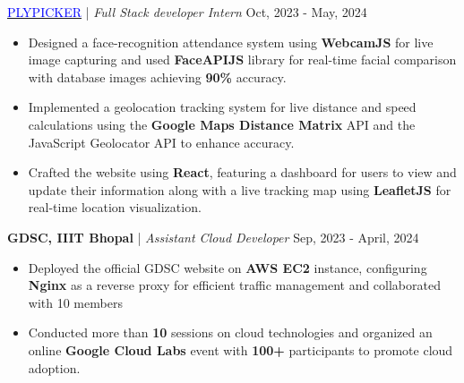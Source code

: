 \documentclass[a4paper]{article}
\begin{document}
 \href{https://drive.google.com/file/d/11zeejmn9jYHZrTlOk4Zbljxd8T7ecB0m/view?usp=sharing}{\textcolor{blue}{PLYPICKER}} {| \sl Full Stack developer Intern} \hfill Oct, 2023 - May, 2024 %
\begin{itemize}
    \vspace{-1mm}
    \item Designed a face-recognition attendance system using \textbf{WebcamJS} for live image capturing and used \textbf{FaceAPIJS} library for real-time facial comparison with database images achieving \textbf{90\%} accuracy.
    \vspace{-1mm}
    \item Implemented a geolocation tracking system for live distance and speed calculations using the \textbf{Google Maps Distance Matrix} API and the JavaScript Geolocator API to enhance accuracy.
    \item Crafted the website using \textbf{React}, featuring a dashboard for users to view and update their information along with a live tracking map using \textbf{LeafletJS} for real-time location visualization.
    \vspace{-1mm}
\end{itemize} 
\vspace{1mm}
\textbf{GDSC, IIIT Bhopal} {| \sl Assistant Cloud Developer} \hfill Sep, 2023 - April, 2024 %
\begin{itemize}
    \vspace{-1mm}
    \item Deployed the official GDSC website on \textbf{AWS EC2} instance, configuring \textbf{Nginx} as a reverse proxy for efficient traffic management and collaborated with 10 members
    \vspace{-1mm}
    \item Conducted more than \textbf{10} sessions on cloud technologies and organized an online \textbf{Google Cloud Labs} event with \textbf{100+} participants to promote cloud adoption.
\end{itemize} 
\end{document}
